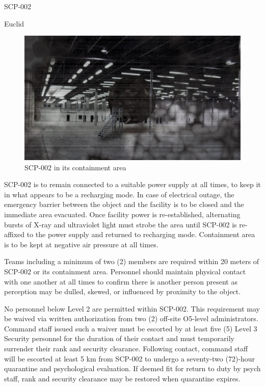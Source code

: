  SCP-002

 Euclid

\begin{figure}[h]
\begin{center}
\includegraphics[scale=0.3]{scp/002.jpg}
\linebreak SCP-002 in its containment area
\end{center}
\end{figure}

 SCP-002 is to remain connected to a suitable power supply at all times, to keep it in what appears to be a recharging mode. In case of electrical outage, the emergency barrier between the object and the facility is to be closed and the immediate area evacuated. Once facility power is re-established, alternating bursts of X-ray and ultraviolet light must strobe the area until SCP-002 is re-affixed to the power supply and returned to recharging mode. Containment area is to be kept at negative air pressure at all times.

Teams including a minimum of two (2) members are required within 20 meters of SCP-002 or its containment area. Personnel should maintain physical contact with one another at all times to confirm there is another person present as perception may be dulled, skewed, or influenced by proximity to the object.

No personnel below Level 2 are permitted within SCP-002. This requirement may be waived via written authorization from two (2) off-site O5-level administrators. Command staff issued such a waiver must be escorted by at least five (5) Level 3 Security personnel for the duration of their contact and must temporarily surrender their rank and security clearance. Following contact, command staff will be escorted at least 5 km from SCP-002 to undergo a seventy-two (72)-hour quarantine and psychological evaluation. If deemed fit for return to duty by psych staff, rank and security clearance may be restored when quarantine expires.

